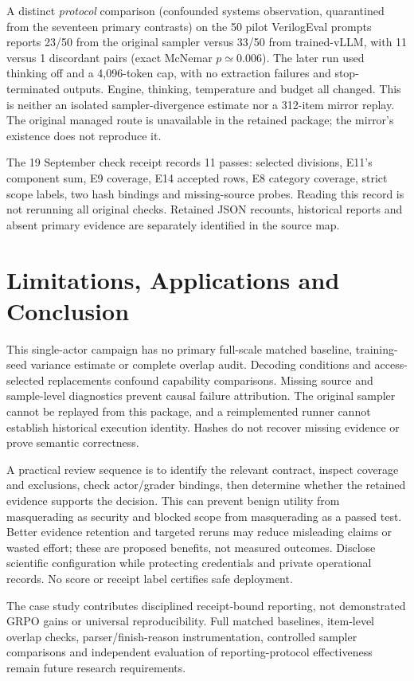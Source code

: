 \documentclass[a4paper,runningheads]{llncs}
\begin{document}
A distinct \emph{protocol} comparison (confounded systems observation,
quarantined from the seventeen primary contrasts) on the 50 pilot VerilogEval prompts
reports 23/50 from the original sampler versus 33/50 from trained-vLLM,
with 11 versus 1 discordant pairs (exact McNemar $p\simeq0.006$).
The later run used thinking off and a 4,096-token cap, with no extraction
failures and stop-terminated outputs. Engine, thinking, temperature and budget
all changed. This is neither an isolated sampler-divergence estimate nor a
312-item mirror replay. The original managed route is unavailable in the
retained package; the mirror's existence does not reproduce it.

The 19 September check receipt records 11 passes: selected divisions, E11's
component sum, E9 coverage, E14 accepted rows, E8 category coverage, strict
scope labels, two hash bindings and missing-source probes. Reading this record
is not rerunning all original checks. Retained JSON recounts, historical reports
and absent primary evidence are separately identified in the source map.

\section{Limitations, Applications and Conclusion}
This single-actor campaign has no primary full-scale matched baseline,
training-seed variance estimate or complete overlap audit. Decoding conditions
and access-selected replacements confound capability comparisons. Missing
source and sample-level diagnostics prevent causal failure attribution.
The original sampler cannot be replayed from this package, and a reimplemented
runner cannot establish historical execution identity. Hashes do not recover
missing evidence or prove semantic correctness.

A practical review sequence is to identify the relevant contract, inspect
coverage and exclusions, check actor/grader bindings, then determine whether
the retained evidence supports the decision. This can prevent benign utility
from masquerading as security and blocked scope from masquerading as a passed
test. Better evidence retention and targeted reruns may reduce misleading
claims or wasted effort; these are proposed benefits, not measured outcomes.
Disclose scientific configuration while protecting credentials and private
operational records. No score or receipt label certifies safe deployment.

The case study contributes disciplined receipt-bound reporting, not demonstrated GRPO gains
or universal reproducibility. Full matched baselines, item-level overlap
checks, parser/finish-reason instrumentation, controlled sampler comparisons
and independent evaluation of reporting-protocol effectiveness remain future research
requirements.
\end{document}

